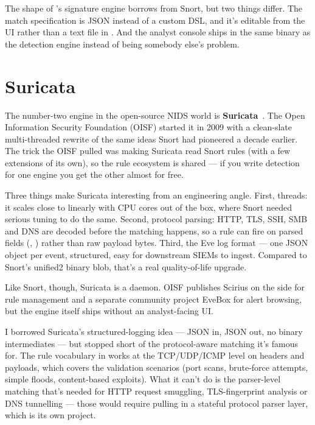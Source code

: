 The shape of \nidsname{}'s signature engine borrows from Snort,
but two things differ. The match specification is JSON instead of
a custom DSL, and it's editable from the UI rather than a text
file in . And the analyst console ships
in the same binary as the detection engine instead of being
somebody else's problem.

\section{Suricata}
\label{sec:rw-suricata}

The number-two engine in the open-source NIDS world is
\textbf{Suricata}~\cite{suricata}. The Open Information Security
Foundation (OISF) started it in 2009 with a clean-slate
multi-threaded rewrite of the same ideas Snort had pioneered a
decade earlier. The trick the OISF pulled was making Suricata
read Snort rules (with a few extensions of its own), so the rule
ecosystem is shared --- if you write detection for one engine you
get the other almost for free.

Three things make Suricata interesting from an engineering angle.
First, threads: it scales close to linearly with CPU cores out of
the box, where Snort needed serious tuning to do the same.
Second, protocol parsing: HTTP, TLS, SSH, SMB and DNS are decoded
before the matching happens, so a rule can fire on parsed
fields (, ) rather than raw
payload bytes. Third, the Eve log format --- one JSON object per
event, structured, easy for downstream SIEMs to ingest. Compared
to Snort's unified2 binary blob, that's a real quality-of-life
upgrade.

Like Snort, though, Suricata is a daemon. OISF publishes Scirius
on the side for rule management and a separate community project
EveBox for alert browsing, but the engine itself ships without an
analyst-facing UI.

I borrowed Suricata's structured-logging idea --- JSON in,
JSON out, no binary intermediates --- but stopped short of the
protocol-aware matching it's famous for. The rule vocabulary in
\nidsname{} works at the TCP/UDP/ICMP level on headers and
payloads, which covers the validation scenarios (port scans,
brute-force attempts, simple floods, content-based exploits).
What it can't do is the parser-level matching that's needed for
HTTP request smuggling, TLS-fingerprint analysis or DNS
tunnelling --- those would require pulling in a stateful
protocol parser layer, which is its own project.

